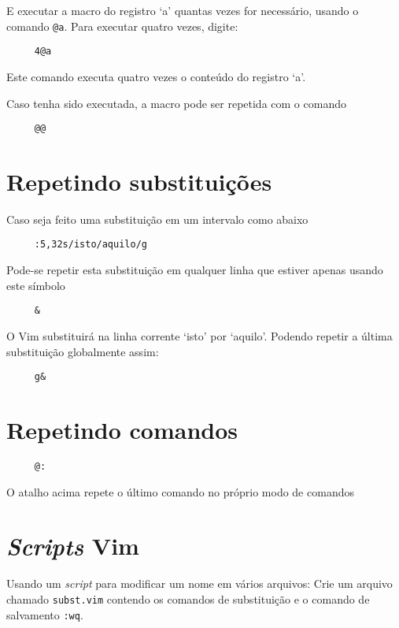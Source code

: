 E executar a macro do registro `a' quantas vezes for necessário,
usando o comando \verb|@a|. Para executar quatro vezes, digite:

\begin{verbatim}
     4@a
\end{verbatim}

Este comando executa quatro vezes o conteúdo do registro `a'.

Caso tenha sido executada, a macro pode ser repetida com o comando

\begin{verbatim}
     @@
\end{verbatim}

\section{Repetindo substituições }
Caso seja feito uma substituição em um intervalo como abaixo

\begin{verbatim}
     :5,32s/isto/aquilo/g
\end{verbatim}

Pode-se repetir esta substituição em qualquer linha que estiver apenas usando este símbolo

\begin{verbatim}
     &
\end{verbatim}

O Vim substituirá na linha corrente `isto' por `aquilo'. Podendo
repetir a última substituição globalmente assim:
   
\begin{verbatim}
     g&
\end{verbatim}

\section{Repetindo comandos}\label{Repetindo comandos}

\begin{verbatim}
     @:
\end{verbatim}

O atalho acima repete o último comando no próprio modo de comandos

\section{{\em Scripts} Vim}\label{Scripts Vim}
Usando um {\em script} para modificar um nome em vários arquivos: 
Crie um arquivo chamado {\tt subst.vim} contendo os comandos de substituição e o
comando de salvamento {\tt :wq}.

